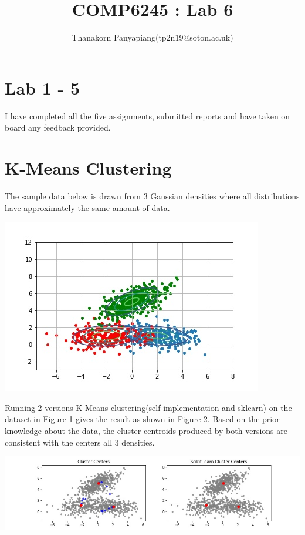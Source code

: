 \documentclass{article}
\title{COMP6245 : Lab 6}
\author{Thanakorn Panyapiang(tp2n19@soton.ac.uk)}
\date{}
\begin{document}
\maketitle

\section{Lab 1 - 5}
I have completed all the five assignments, submitted reports and have taken on board any feedback provided.

\section{K-Means Clustering}
The sample data below is drawn from 3 Gaussian densities where all distributions have approximately the same amount of data.\\
\begin{center}
\includegraphics[scale=0.3]{distribution-balance}
\end{center}

Running 2 versions K-Means clustering(self-implementation and sklearn) on the dataset in Figure 1 gives the result as shown in Figure 2. Based on the prior knowledge about the data, the cluster centroids produced by both versions are consistent with the centers all 3 densities.
\begin{center}
\includegraphics[scale=0.4]{sklean-compare-balance}
\end{center}
\end{document}
